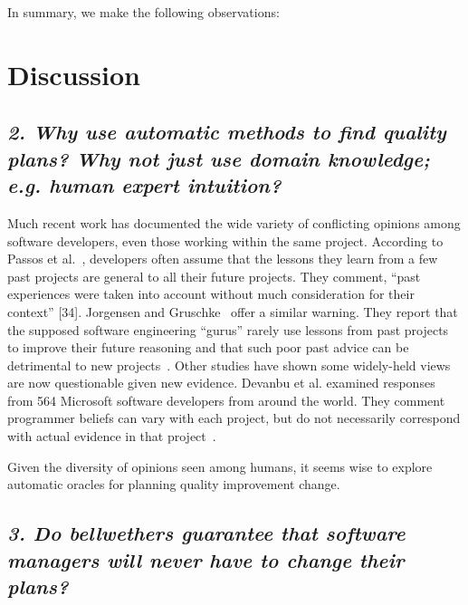 \documentclass[10pt,journal,compsoc]{IEEEtran}
\begin{document}
In summary, we make the following observations:


\section{Discussion}
\label{sect:discuss}
\subsection*{\textit{2. Why use automatic methods to find quality plans? Why not just use domain knowledge; e.g. human expert intuition?}}

Much recent work has documented the wide variety of conflicting
opinions among software developers, even those working within the same project. According to Passos et al.~\cite{passos11}, developers often assume that the lessons they learn from a few past projects are general to all their future projects. They comment, “past experiences were taken into account without
much consideration for their context” [34]. Jorgensen and Gruschke~\cite{jorgensen09} offer a similar warning. They report that the supposed software engineering ``gurus” rarely use lessons from past projects to improve their future reasoning and that such poor past advice can be detrimental to new projects~\cite{jorgensen09}. Other studies have shown some widely-held views are now questionable given new evidence. Devanbu et al. examined responses from 564 Microsoft software developers from around the world. They comment programmer beliefs can vary with
each project, but do not necessarily correspond with actual evidence
in that project~\cite{prem16}.

Given the diversity of opinions seen among humans, it seems wise to explore automatic oracles for planning quality improvement change.

\subsection*{\textit{3. Do bellwethers guarantee that software managers will never have to change their plans?}}
\end{document}
